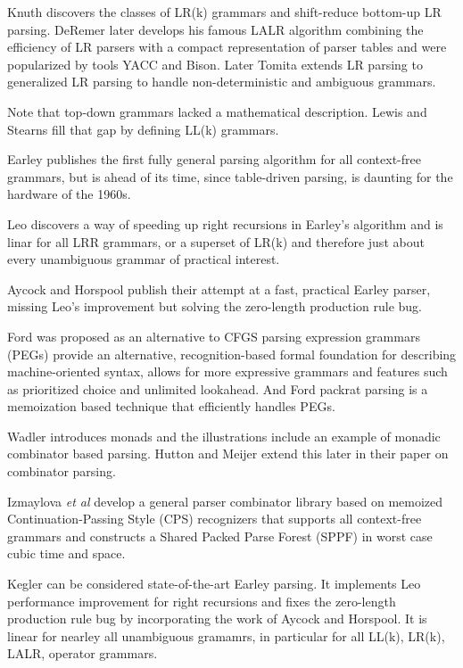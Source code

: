 \begin{isabellebody}
\begin{isamarkuptext}
Knuth \cite{Knuth:1965} discovers the classes of LR(k) grammars and shift-reduce bottom-up LR parsing.
DeRemer \cite{DeRemer:1969} later develops his famous LALR algorithm combining the efficiency of
LR parsers with a compact representation of parser tables and were popularized by tools YACC and Bison.
Later Tomita \cite{Tomita:1985} extends LR parsing to generalized LR parsing to handle non-deterministic
and ambiguous grammars.

Note that top-down grammars lacked a mathematical description. Lewis and Stearns \cite{Lewis:1968}
fill that gap by defining LL(k) grammars.

Earley \cite{Earley:1970} publishes the first fully general parsing algorithm for all context-free grammars,
but is ahead of its time, since table-driven parsing, is daunting for the hardware of the 1960s.

Leo \cite{Leo:1991} discovers a way of speeding up right recursions in Earley's algorithm and is
linar for all LRR grammars, or a superset of LR(k) and therefore just about every unambiguous grammar
of practical interest.

Aycock and Horspool \cite{Aycock:2002} publish their attempt at a fast, practical Earley parser,
missing Leo's improvement but solving the zero-length production rule bug.

Ford \cite{Ford:2004} was proposed as an alternative to CFGS parsing expression grammars (PEGs)
provide an alternative, recognition-based formal foundation for describing machine-oriented
syntax, allows for more expressive grammars and features such as prioritized choice and unlimited
lookahead. And Ford \cite{Ford:2006} packrat parsing is a memoization based technique that efficiently
handles PEGs.

Wadler \cite{Wadler:1995} introduces monads and the illustrations include an example of
monadic combinator based parsing. Hutton and Meijer \cite{Hutton:1996} extend this later in their
paper on combinator parsing.

Izmaylova \textit{et al} \cite{Izmaylova:2016} develop a general parser 
combinator library based on memoized Continuation-Passing Style (CPS) recognizers that supports all
context-free grammars and constructs a Shared Packed Parse Forest (SPPF) in worst case cubic time and space.

Kegler \cite{Kegler:2023} can be considered state-of-the-art Earley parsing. It implements Leo performance
improvement for right recursions and fixes the zero-length production rule bug by incorporating the
work of Aycock and Horspool. It is linear for nearley all unambiguous gramamrs, in particular
for all LL(k), LR(k), LALR, operator grammars.


\end{isamarkuptext}
\end{isabellebody}
